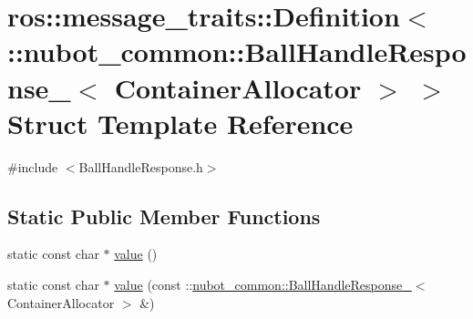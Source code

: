 \hypertarget{structros_1_1message__traits_1_1Definition_3_01_1_1nubot__common_1_1BallHandleResponse___3_01ContainerAllocator_01_4_01_4}{\section{ros\-:\-:message\-\_\-traits\-:\-:Definition$<$ \-:\-:nubot\-\_\-common\-:\-:Ball\-Handle\-Response\-\_\-$<$ Container\-Allocator $>$ $>$ Struct Template Reference}
\label{structros_1_1message__traits_1_1Definition_3_01_1_1nubot__common_1_1BallHandleResponse___3_01ContainerAllocator_01_4_01_4}
}


{\ttfamily \#include $<$Ball\-Handle\-Response.\-h$>$}

\subsection*{Static Public Member Functions}
\begin{DoxyCompactItemize}
\item 
static const char $\ast$ \hyperlink{structros_1_1message__traits_1_1Definition_3_01_1_1nubot__common_1_1BallHandleResponse___3_01ContainerAllocator_01_4_01_4_abf31a68a219e63152edf609798d7c9ae}{value} ()
\item 
static const char $\ast$ \hyperlink{structros_1_1message__traits_1_1Definition_3_01_1_1nubot__common_1_1BallHandleResponse___3_01ContainerAllocator_01_4_01_4_a5e257232ee07a1387df8bbcd61d38b91}{value} (const \-::\hyperlink{structnubot__common_1_1BallHandleResponse__}{nubot\-\_\-common\-::\-Ball\-Handle\-Response\-\_\-}$<$ Container\-Allocator $>$ \&)
\end{DoxyCompactItemize}


